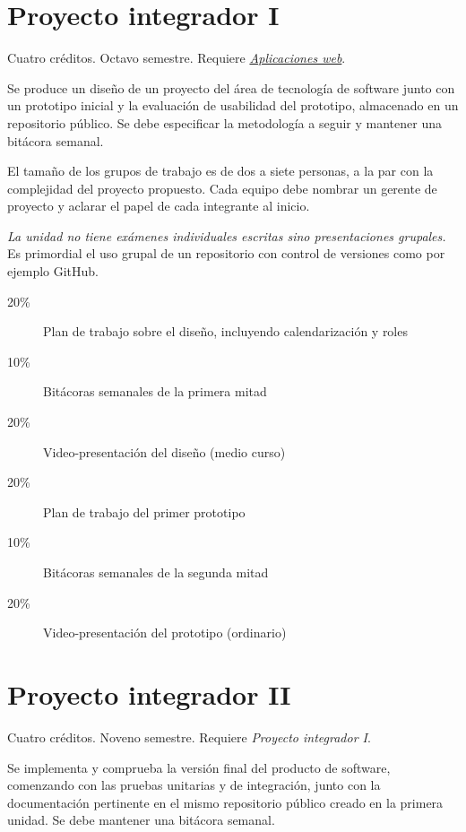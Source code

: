 \documentclass{article}
\begin{document}
\begin{multicols}{4}
\vfill\null \columnbreak

\hypertarget{pi1}{\section*{Proyecto integrador I}} 

Cuatro cr\'{e}ditos. Octavo semestre. Requiere \hyperlink{aw}{\em
  Aplicaciones web}.

Se produce un dise\~{n}o de un proyecto del \'{a}rea de tecnolog\'{i}a de
software junto con un prototipo inicial y la evaluaci\'{o}n de usabilidad
del prototipo, almacenado en un repositorio p\'{u}blico. Se debe
especificar la metodolog\'{i}a a seguir y mantener una bit\'{a}cora
semanal.

El tama\~{n}o de los grupos de trabajo es de dos a siete personas, a
la par con la complejidad del proyecto propuesto. Cada equipo debe
nombrar un gerente de proyecto y aclarar el papel de cada integrante
al inicio.

{\em La unidad no tiene ex\'{a}menes individuales escritas sino
  presentaciones grupales.} Es primordial el uso grupal de un
repositorio con control de versiones como por ejemplo GitHub.

\begin{description}
\item[20\%]{Plan de trabajo sobre el dise\~{n}o, incluyendo calendarizaci\'{o}n y roles}
\item[10\%]{Bit\'{a}coras semanales de la primera mitad}
\item[20\%]{Video-presentaci\'{o}n del dise\~{n}o (medio curso)}
\item[20\%]{Plan de trabajo del primer prototipo}
\item[10\%]{Bit\'{a}coras semanales de la segunda mitad}
\item[20\%]{Video-presentaci\'{o}n del prototipo (ordinario)}
\end{description}  

\vfill\null \columnbreak

\hypertarget{pi2}{\section*{Proyecto integrador II}} 

Cuatro cr\'{e}ditos. Noveno semestre. Requiere {\em Proyecto integrador I}.

Se implementa y comprueba la versi\'{o}n final del producto de
software, comenzando con las pruebas unitarias y de integraci\'{o}n, junto
con la documentaci\'{o}n pertinente en el mismo repositorio
p\'{u}blico creado en la primera unidad. Se debe mantener una
bit\'{a}cora semanal.


\end{multicols}
\end{document}
